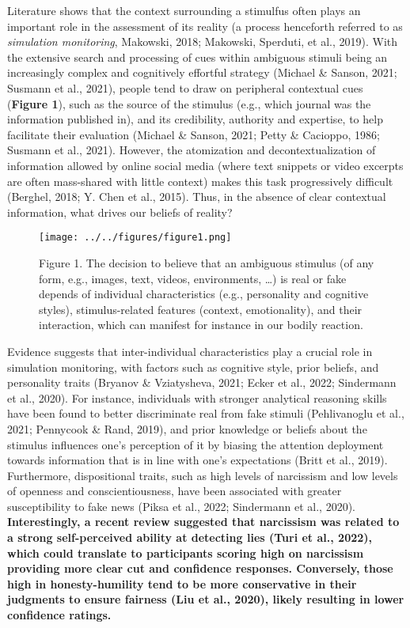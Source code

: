 \documentclass[
  man,
  floatsintext,
  longtable,
  nolmodern,
  notxfonts,
  notimes,
  colorlinks=true,linkcolor=blue,citecolor=blue,urlcolor=blue]{apa7}
\begin{document}
Literature shows that the context surrounding a stimulfus often plays an
important role in the assessment of its reality (a process henceforth
referred to as \emph{simulation monitoring}, Makowski, 2018; Makowski,
Sperduti, et al., 2019). With the extensive search and processing of
cues within ambiguous stimuli being an increasingly complex and
cognitively effortful strategy (Michael \& Sanson, 2021; Susmann et al.,
2021), people tend to draw on peripheral contextual cues (\textbf{Figure
1}), such as the source of the stimulus (e.g., which journal was the
information published in), and its credibility, authority and expertise,
to help facilitate their evaluation (Michael \& Sanson, 2021; Petty \&
Cacioppo, 1986; Susmann et al., 2021). However, the atomization and
decontextualization of information allowed by online social media (where
text snippets or video excerpts are often mass-shared with little
context) makes this task progressively difficult (Berghel, 2018; Y. Chen
et al., 2015). Thus, in the absence of clear contextual information,
what drives our beliefs of reality?

\begin{figure}[H]

\caption{Figure 1. The decision to believe that an ambiguous stimulus
(of any form, e.g., images, text, videos, environments, \ldots) is real
or fake depends of individual characteristics (e.g., personality and
cognitive styles), stimulus-related features (context, emotionality),
and their interaction, which can manifest for instance in our bodily
reaction.}

{\centering \texttt{[image: ../../figures/figure1.png]}

}

\end{figure}%

Evidence suggests that inter-individual characteristics play a crucial
role in simulation monitoring, with factors such as cognitive style,
prior beliefs, and personality traits (Bryanov \& Vziatysheva, 2021;
Ecker et al., 2022; Sindermann et al., 2020). For instance, individuals
with stronger analytical reasoning skills have been found to better
discriminate real from fake stimuli (Pehlivanoglu et al., 2021;
Pennycook \& Rand, 2019), and prior knowledge or beliefs about the
stimulus influences one's perception of it by biasing the attention
deployment towards information that is in line with one's expectations
(Britt et al., 2019). Furthermore, dispositional traits, such as high
levels of narcissism and low levels of openness and conscientiousness,
have been associated with greater susceptibility to fake news (Piksa et
al., 2022; Sindermann et al., 2020). \textbf{Interestingly, a recent
review suggested that narcissism was related to a strong self-perceived
ability at detecting lies (Turi et al., 2022), which could translate to
participants scoring high on narcissism providing more clear cut and
confidence responses. Conversely, those high in honesty-humility tend to
be more conservative in their judgments to ensure fairness (Liu et al.,
2020), likely resulting in lower confidence ratings.}
\end{document}
